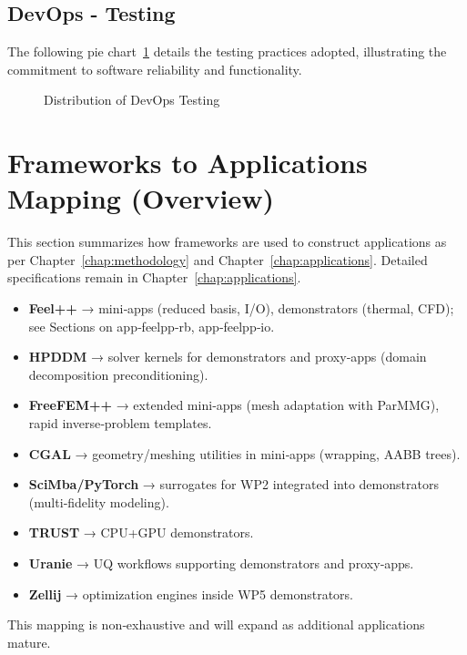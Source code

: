 \subsection{DevOps - Testing}

The following pie chart~\ref{fig:devops-testing} details the testing practices adopted, illustrating the commitment to software reliability and functionality.

\begin{figure}[H]
\centering
{}
\caption{Distribution of DevOps Testing}
\label{fig:devops-testing}
\end{figure}


%














\section{Frameworks to Applications Mapping (Overview)}
This section summarizes how frameworks are used to construct applications as per Chapter~\ref{chap:methodology} and Chapter~\ref{chap:applications}. Detailed specifications remain in Chapter~\ref{chap:applications}.

\begin{itemize}
    \item \textbf{Feel++} → mini‑apps (reduced basis, I/O), demonstrators (thermal, CFD); see Sections on app‑feelpp‑rb, app‑feelpp‑io.
    \item \textbf{HPDDM} → solver kernels for demonstrators and proxy‑apps (domain decomposition preconditioning).
    \item \textbf{FreeFEM++} → extended mini‑apps (mesh adaptation with ParMMG), rapid inverse‑problem templates.
    \item \textbf{CGAL} → geometry/meshing utilities in mini‑apps (wrapping, AABB trees).
    \item \textbf{SciMba/PyTorch} → surrogates for WP2 integrated into demonstrators (multi‑fidelity modeling).
    \item \textbf{TRUST} → CPU+GPU demonstrators.
    \item \textbf{Uranie} → UQ workflows supporting demonstrators and proxy‑apps.
    \item \textbf{Zellij} → optimization engines inside WP5 demonstrators.
\end{itemize}

This mapping is non‑exhaustive and will expand as additional applications mature.

